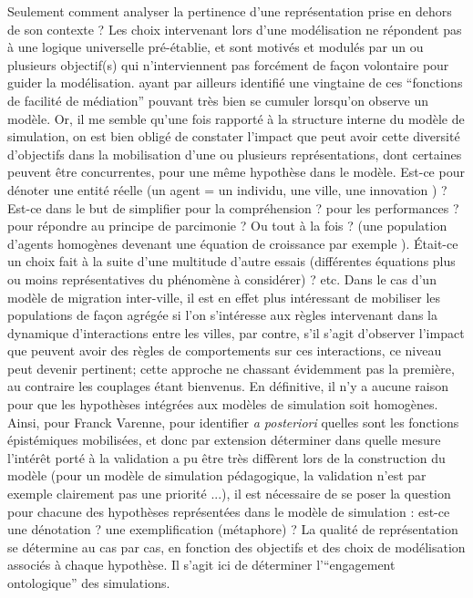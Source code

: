 Seulement comment analyser la pertinence d'une représentation prise en dehors de son contexte ? Les choix intervenant lors d'une modélisation ne répondent pas à une logique universelle pré-établie, et sont motivés et modulés par un ou plusieurs objectif(s) qui n’interviennent pas forcément de façon volontaire pour guider la modélisation. \textcite{Varenne2013b} ayant par ailleurs identifié une vingtaine de ces \enquote{fonctions de facilité de médiation} pouvant très bien se cumuler lorsqu’on observe un modèle. Or, il me semble qu'une fois rapporté à la structure interne du modèle de simulation, on est bien obligé de constater l'impact que peut avoir cette diversité d'objectifs dans la mobilisation d’une ou plusieurs représentations, dont certaines peuvent être concurrentes, pour une même hypothèse dans le modèle. Est-ce pour dénoter une entité réelle (un agent = un individu, une ville, une innovation ) ? Est-ce dans le but de simplifier pour la compréhension ? pour les performances ? pour répondre au principe de parcimonie ? Ou tout à la fois ? (une population d'agents homogènes devenant une équation de croissance par exemple ). Était-ce un choix fait à la suite d’une multitude d'autre essais (différentes équations plus ou moins représentatives du phénomène à considérer) ? etc. Dans le cas d'un modèle de migration inter-ville, il est en effet plus intéressant de mobiliser les populations de façon agrégée si l'on s'intéresse aux règles intervenant dans la dynamique d'interactions entre les villes, par contre, s'il s'agit d'observer l'impact que peuvent avoir des règles de comportements sur ces interactions, ce niveau peut devenir pertinent; cette approche ne chassant évidemment pas la première, au contraire les couplages étant bienvenus. En définitive, il n'y a aucune raison pour que les hypothèses intégrées aux modèles de simulation soit homogènes. Ainsi, pour Franck Varenne, pour identifier \textit{a posteriori} quelles sont les fonctions épistémiques mobilisées, et donc par extension déterminer dans quelle mesure l'intérêt porté à la validation a pu être très diffèrent lors de la construction du modèle (pour un modèle de simulation pédagogique, la validation n’est par exemple clairement pas une priorité ...), il est nécessaire de se poser la question pour chacune des hypothèses représentées dans le modèle de simulation : est-ce une dénotation ? une exemplification (métaphore) ? La qualité de représentation se détermine au cas par cas, en fonction des objectifs et des choix de modélisation associés à chaque hypothèse. Il s'agit ici de déterminer l'\enquote{engagement ontologique} des simulations.

